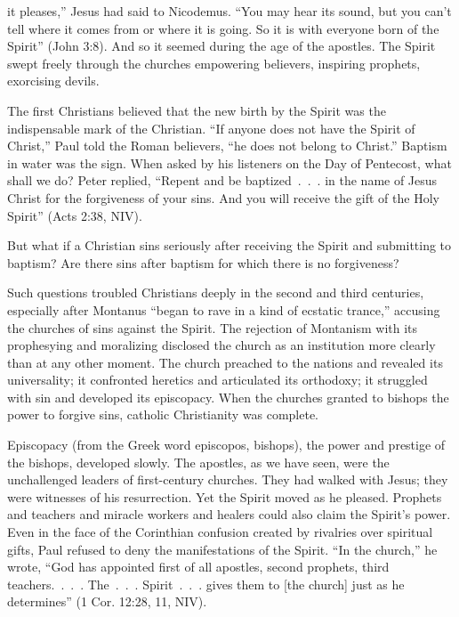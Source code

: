 
 it pleases,” Jesus had said to Nicodemus. “You may hear its
sound, but you can’t tell where it comes from or where it is going. So it is with everyone born of
the Spirit” (John 3:8). And so it seemed during the age of the apostles. The Spirit swept freely
through the churches empowering believers, inspiring prophets, exorcising devils.

The first Christians believed that the new birth by the Spirit was the indispensable mark of the
Christian. “If anyone does not have the Spirit of Christ,” Paul told the Roman believers, “he does
not belong to Christ.” Baptism in water was the sign. When asked by his listeners on the Day of
Pentecost, what shall we do? Peter replied, “Repent and be baptized~.~.~. in the name of Jesus
Christ for the forgiveness of your sins. And you will receive the gift of the Holy Spirit” (Acts
2:38, NIV).

But what if a Christian sins seriously after receiving the Spirit and submitting to baptism? Are
there sins after baptism for which there is no forgiveness?

Such questions troubled Christians deeply in the second and third centuries, especially after
Montanus “began to rave in a kind of ecstatic trance,” accusing the churches of sins against the
Spirit. The rejection of Montanism with its prophesying and moralizing disclosed the church as an
institution more clearly than at any other moment. The church preached to the nations and revealed
its universality; it confronted heretics and articulated its orthodoxy; it struggled with sin and
developed its episcopacy. When the churches granted to bishops the power to forgive sins, catholic
Christianity was complete.

Episcopacy (from the Greek word episcopos, bishops), the power and prestige of the bishops,
developed slowly. The apostles, as we have seen, were the unchallenged leaders of first-century
churches. They had walked with Jesus; they were witnesses of his resurrection. Yet the Spirit moved
as he pleased. Prophets and teachers and miracle workers and healers could also claim the Spirit’s
power. Even in the face of the Corinthian confusion created by rivalries over spiritual gifts, Paul
refused to deny the manifestations of the Spirit. “In the church,” he wrote, “God has appointed
first of all apostles, second prophets, third teachers.~.~.~. The~.~.~. Spirit~.~.~. gives them to
[the church] just as he determines” (1 Cor. 12:28, 11, NIV).

